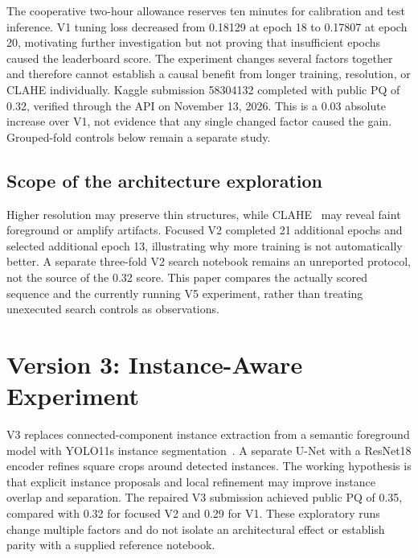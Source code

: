 \documentclass[sigconf]{acmart}
\begin{document}
The cooperative two-hour allowance reserves ten minutes for calibration
and test inference. V1 tuning loss decreased from 0.18129 at epoch 18
to 0.17807 at epoch 20, motivating further investigation but not proving
that insufficient epochs caused the leaderboard score. The experiment
changes several factors together and therefore cannot establish a causal
benefit from longer training, resolution, or CLAHE individually.
Kaggle submission 58304132 completed with public PQ of 0.32, verified
through the API on November 13, 2026. This is a 0.03 absolute increase
over V1, not evidence that any single changed factor caused the gain.
Grouped-fold controls below remain a separate study.

\subsection{Scope of the architecture exploration}
Higher resolution may preserve thin structures, while CLAHE~\cite{opencvclahe}
may reveal faint foreground or amplify artifacts. Focused V2 completed
21 additional epochs and selected additional epoch 13, illustrating why
more training is not automatically better. A separate three-fold V2
search notebook remains an unreported protocol, not the source of the
0.32 score. This paper compares the actually scored sequence and the
currently running V5 experiment, rather than treating unexecuted search
controls as observations.



\section{Version 3: Instance-Aware Experiment}
V3 replaces connected-component instance extraction from a semantic
foreground model with YOLO11s instance segmentation~\cite{ultralyticsseg}.
A separate U-Net with a ResNet18 encoder refines square crops around
detected instances. The working hypothesis is that explicit instance
proposals and local refinement may improve instance overlap and separation.
The repaired V3 submission achieved public PQ of 0.35, compared with
0.32 for focused V2 and 0.29 for V1. These exploratory runs change multiple
factors and do not isolate an architectural effect or establish parity
with a supplied reference notebook.
\end{document}
